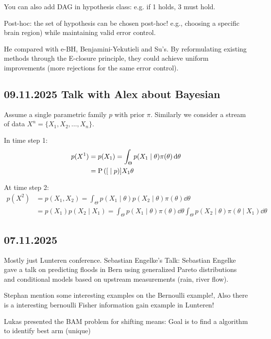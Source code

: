 You can also add DAG in hypothesis class: e.g. if 1 holds, 3 must hold.

Post-hoc: the set of hypothesis can be chosen post-hoc! e.g., choosing a specific brain region) while maintaining valid error control.

He compared with e-BH, Benjamini-Yekutieli and Su's. By reformulating existing methods through the E-closure principle, they could achieve uniform improvements (more rejections for the same error control).

\subsection*{09.11.2025 Talk with Alex about Bayesian}

Assume a single parametric family $p$ with prior $\pi$.
Similarly we consider a stream of data $X^n=\{X_1,X_2,\dots,X_n\}$.

In time step 1:
\begin{align*}
	p(X^1) & = p(X_1) = \int_{\Theta} p(X_1\mid\theta)\pi(\theta) \dd{\theta} \\
	       & = \condPR[p]{X_1}{\theta}
\end{align*}

At time step 2:
\begin{align*}
	p(X^2) & =p(X_1,X_2) = \int_{\Theta} p(X_1\mid\theta)p(X_2\mid\theta)\pi(\theta)\dd{\theta}                                                            \\
	       & = p(X_1)p(X_2\mid X_1) = \int_{\Theta} p(X_1\mid\theta)\pi(\theta) \dd{\theta} \int_{\Theta} p(X_2\mid\theta)\pi(\theta\mid  X_1) \dd{\theta}
\end{align*}


\subsection*{07.11.2025}

Mostly just Lunteren conference. Sebastian Engelke's Talk: Sebastian Engelke gave a talk on predicting floods in Bern using generalized Pareto distributions and conditional models based on upstream measurements (rain, river flow).

Stephan mention some interesting examples on the Bernoulli example!, Also there is a interesting bernoulli Fisher information gain example in Lunteren!

Lukas presented the BAM problem for shifting means: Goal is to find a algorithm to identify best arm (unique)

